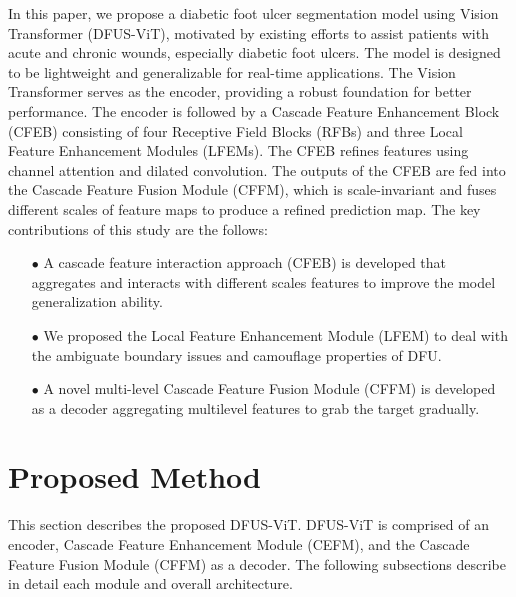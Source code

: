 \documentclass[review]{elsarticle}
\begin{document}
\newline\indent In this paper, we propose a diabetic foot ulcer segmentation model using Vision Transformer (DFUS-ViT), motivated by existing efforts to assist patients with acute and chronic wounds, especially diabetic foot ulcers. The model is designed to be lightweight and generalizable for real-time applications. The Vision Transformer serves as the encoder, providing a robust foundation for better performance. The encoder is followed by a Cascade Feature Enhancement Block (CFEB) consisting of four Receptive Field Blocks (RFBs) and three Local Feature Enhancement Modules (LFEMs). The CFEB refines features using channel attention and dilated convolution. The outputs of the CFEB are fed into the Cascade Feature Fusion Module (CFFM), which is scale-invariant and fuses different scales of feature maps to produce a refined prediction map. The key contributions of this study are the follows: 
\begin{enumerate}	
		
	\item[$\bullet$] A cascade feature interaction approach (CFEB) is developed that aggregates and interacts with different scales features to improve the model generalization ability.
	\item [$\bullet$] We proposed the Local Feature Enhancement Module (LFEM) to deal with the ambiguate boundary issues and camouflage properties of DFU.
	\item[$\bullet$] A novel multi-level Cascade Feature Fusion Module (CFFM) is developed as a decoder aggregating multilevel features to grab the target gradually.
	
\end{enumerate}


\section{Proposed Method}
\label{Proposed Method}
This section describes the proposed DFUS-ViT. DFUS-ViT is comprised of an encoder, Cascade Feature Enhancement Module (CEFM), and the Cascade Feature Fusion Module (CFFM) as a decoder. The following subsections describe in detail each module and overall architecture.
\end{document}
